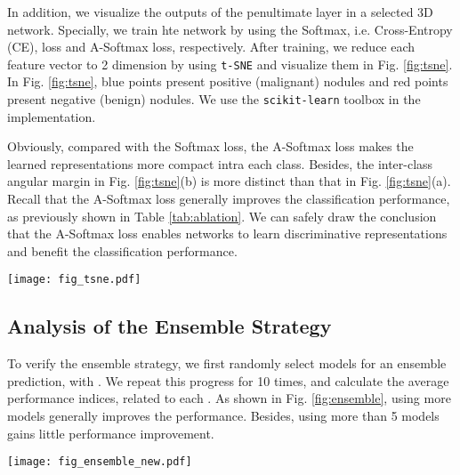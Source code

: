 \documentclass[final,5p,times,twocolumn]{elsarticle}
\begin{document}
In addition, we visualize the outputs of the penultimate layer in a selected 3D network. Specially, we train hte network by using the Softmax, i.e. Cross-Entropy (CE), loss and A-Softmax loss, respectively. After training, we reduce each feature vector to 2 dimension by using \texttt{t-SNE} \cite{maaten2008tSNE} and visualize them in Fig. \ref{fig:tsne}. In Fig. \ref{fig:tsne}, blue points present positive (malignant) nodules and red points present negative (benign) nodules. We use the \texttt{scikit-learn} toolbox \cite{2011scikitlearn} in the implementation. 

Obviously, compared with the Softmax loss, the A-Softmax loss makes the learned representations more compact intra each class. Besides, the inter-class angular margin in Fig. \ref{fig:tsne}(b) is more distinct than that in Fig. \ref{fig:tsne}(a). Recall that the A-Softmax loss generally improves the classification performance, as previously shown in Table \ref{tab:ablation}. We can safely draw the conclusion that the A-Softmax loss enables networks to learn discriminative representations and benefit the classification performance.

\begin{figure*}
\centering
\texttt{[image: fig\_tsne.pdf]} \\
\caption{Visualization of the learned features: (a) the features learned by the Softmax loss and (b) those learned by the A-Softmax Loss. }
\label{fig:tsne}
\end{figure*}






\subsection{Analysis of the Ensemble Strategy}
\label{ssec:exp_ensemble}

To verify the ensemble strategy, we first randomly select  models for an ensemble prediction, with . We repeat this progress for 10 times, and calculate the average performance indices, related to each .  As shown in Fig. \ref{fig:ensemble}, using more models generally improves the performance. Besides, using more than 5 models gains little performance improvement.




\begin{figure*}
\centering
\texttt{[image: fig\_ensemble\_new.pdf]} \\
\caption{Performance of the proposed method while using different number of models.}
\label{fig:ensemble}
\end{figure*}
\end{document}
